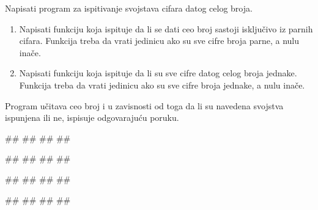 \begin{Exercise}[label=FUN_13] 
Napisati program za ispitivanje svojstava cifara datog celog broja.
\begin{enumerate}
\item Napisati funkciju  koja ispituje da li
  se dati ceo broj sastoji isključivo iz parnih cifara. Funkcija treba
  da vrati jedinicu ako su sve cifre broja parne, a nulu inače.
\item Napisati funkciju  koja ispituje da
  li su sve cifre datog celog broja jednake. Funkcija treba da vrati jedinicu
  ako su sve cifre broja jednake, a nulu inače.
\end{enumerate}
Program učitava ceo broj i u zavisnosti od toga da li su navedena svojstva ispunjena ili ne,
ispisuje odgovarajuću poruku.

\begin{miditest}
\begin{upotreba}{1}
#\naslovInt#
##
##
##
\end{upotreba}
\end{miditest}
\begin{miditest}
\begin{upotreba}{2}
#\naslovInt#
##
##
##
\end{upotreba}
\end{miditest}

\begin{miditest}
\begin{upotreba}{3}
#\naslovInt#
##
##
##
\end{upotreba}
\end{miditest}
\begin{miditest}
\begin{upotreba}{4}
#\naslovInt#
##
##
##
\end{upotreba}
\end{miditest}

\end{Exercise}
\ifresenja 
\begin{Answer}[ref=FUN_13]
\end{Answer} 
\fi


